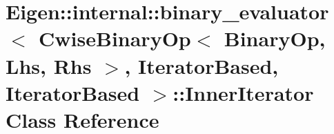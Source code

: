 \hypertarget{class_eigen_1_1internal_1_1binary__evaluator_3_01_cwise_binary_op_3_01_binary_op_00_01_lhs_00_01bbcbab6e07c6c8a44f9c2134b78b5906}{}\section{Eigen\+:\+:internal\+:\+:binary\+\_\+evaluator$<$ Cwise\+Binary\+Op$<$ Binary\+Op, Lhs, Rhs $>$, Iterator\+Based, Iterator\+Based $>$\+:\+:Inner\+Iterator Class Reference}
\label{class_eigen_1_1internal_1_1binary__evaluator_3_01_cwise_binary_op_3_01_binary_op_00_01_lhs_00_01bbcbab6e07c6c8a44f9c2134b78b5906}
